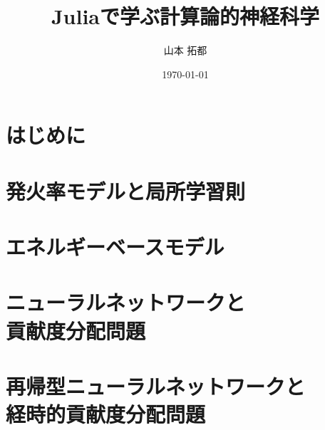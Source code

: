 \documentclass[titlepage]{ltjsbook}
\title{\Huge \textbf{Juliaで学ぶ計算論的神経科学}}
\author{\huge 山本 拓都}
\date{\huge \today}
\begin{document}
\maketitle

\setcounter{tocdepth}{2}
\tableofcontents
\clearpage
\chapter{はじめに}


\chapter{発火率モデルと局所学習則}
%
% 
% 

\chapter{エネルギーベースモデル}
\chapter[ニューラルネットワークと貢献度分配問題]{ニューラルネットワークと\\貢献度分配問題}
\chapter[再帰型ニューラルネットワークと経時的貢献度分配問題]{再帰型ニューラルネットワークと\\経時的貢献度分配問題}
\end{document}
